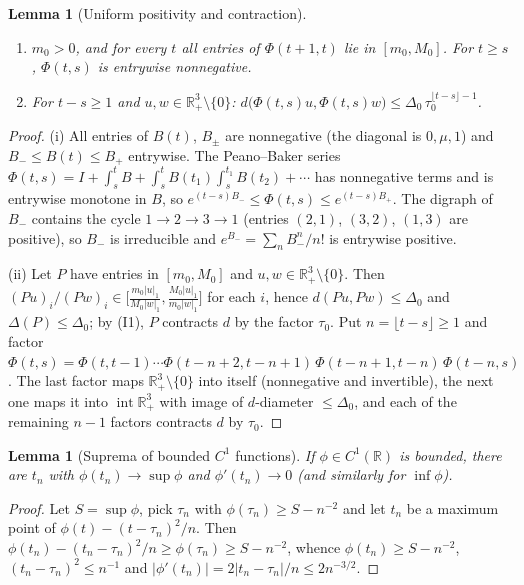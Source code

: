 \documentclass[11pt,a4paper]{article}
\numberwithin{equation}{section}
\newtheorem{lemma}[theorem]{Lemma}
\theoremstyle{remark}\newtheorem{remark}[theorem]{Remark}
\newcommand{\R}{\mathbb R}
\DeclareMathOperator{\inter}{int}
\begin{document}
\begin{lemma}[Uniform positivity and contraction]\label{lem:cone}
\begin{enumerate}[label=\textup{(\roman*)}]
\item $m_0>0$, and for every $t$ all entries of $\Phi(t+1,t)$ lie in $[m_0,M_0]$. For $t\ge s$, $\Phi(t,s)$ is
entrywise nonnegative.
\item For $t-s\ge1$ and $u,w\in\R^3_+\setminus\{0\}$:
$d\bigl(\Phi(t,s)u,\Phi(t,s)w\bigr)\le\Delta_0\,\tau_0^{\lfloor t-s\rfloor-1}$.
\end{enumerate}
\end{lemma}
\begin{proof}
(i) All entries of $B(t)$, $B_\pm$ are nonnegative (the diagonal is $0,\mu,1$) and $B_-\le B(t)\le B_+$ entrywise.
The Peano--Baker series $\Phi(t,s)=I+\int_s^tB+\int_s^tB(t_1)\int_s^{t_1}B(t_2)+\cdots$ has nonnegative terms and is
entrywise monotone in $B$, so $e^{(t-s)B_-}\le\Phi(t,s)\le e^{(t-s)B_+}$. The digraph of $B_-$ contains the cycle
$1\to2\to3\to1$ (entries $(2,1)$, $(3,2)$, $(1,3)$ are positive), so $B_-$ is irreducible and
$e^{B_-}=\sum_nB_-^n/n!$ is entrywise positive.

(ii) Let $P$ have entries in $[m_0,M_0]$ and $u,w\in\R^3_+\setminus\{0\}$. Then
$(Pu)_i/(Pw)_i\in\bigl[\tfrac{m_0|u|_1}{M_0|w|_1},\tfrac{M_0|u|_1}{m_0|w|_1}\bigr]$ for each $i$, hence
$d(Pu,Pw)\le\Delta_0$ and $\Delta(P)\le\Delta_0$; by (I1), $P$ contracts $d$ by the factor $\tau_0$. Put
$n=\lfloor t-s\rfloor\ge1$ and factor
$\Phi(t,s)=\Phi(t,t-1)\cdots\Phi(t-n+2,t-n+1)\,\Phi(t-n+1,t-n)\,\Phi(t-n,s)$. The last factor maps
$\R^3_+\setminus\{0\}$ into itself (nonnegative and invertible), the next one maps it into $\inter\R^3_+$ with image
of $d$-diameter $\le\Delta_0$, and each of the remaining $n-1$ factors contracts $d$ by $\tau_0$.
\end{proof}

\begin{lemma}[Suprema of bounded $C^1$ functions]\label{lem:sup}
If $\phi\in C^1(\R)$ is bounded, there are $t_n$ with $\phi(t_n)\to\sup\phi$ and $\phi'(t_n)\to0$ (and similarly
for $\inf\phi$).
\end{lemma}
\begin{proof}
Let $S=\sup\phi$, pick $\tau_n$ with $\phi(\tau_n)\ge S-n^{-2}$ and let $t_n$ be a maximum point of
$\phi(t)-(t-\tau_n)^2/n$. Then $\phi(t_n)-(t_n-\tau_n)^2/n\ge\phi(\tau_n)\ge S-n^{-2}$, whence
$\phi(t_n)\ge S-n^{-2}$, $(t_n-\tau_n)^2\le n^{-1}$ and $|\phi'(t_n)|=2|t_n-\tau_n|/n\le2n^{-3/2}$.
\end{proof}
\end{document}
